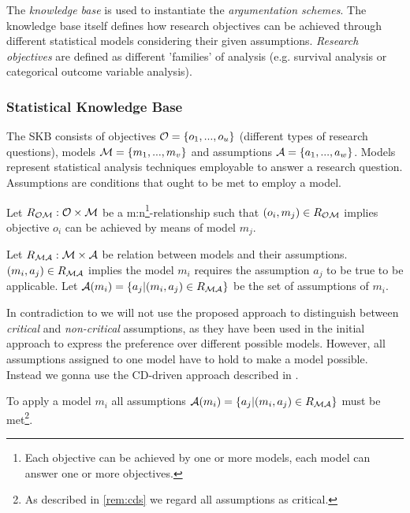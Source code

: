 The \textit{knowledge base} is used to instantiate the \textit{argumentation schemes}. The knowledge base itself defines how research objectives can be achieved through different statistical models considering their given assumptions. \textit{Research objectives} are defined as different 'families' of analysis (e.g. survival analysis or categorical outcome variable analysis).


\subsubsection*{Statistical Knowledge Base}


The \gls{SKB} consists of objectives $\mathcal{O}=\{o_1, ..., o_u\}$ (different types of research questions), models $\mathcal{M}=\{m_1, ..., m_v\}$ and assumptions $\mathcal{A} = \{a_1, ..., a_w\}$. Models represent statistical analysis techniques employable to answer a research question. Assumptions are conditions that ought to be met to employ a model.

\begin{definition}
	Let $R_{\mathcal{O}\mathcal{M}}: \mathcal{O} \times \mathcal{M}$ be a m:n\footnote{Each objective can be achieved by one or more models, each model can answer one or more objectives.}-relationship such that $(o_i, m_j)\in R_{\mathcal{O}\mathcal{M}}$ implies objective $o_i$ can be achieved by means of model $m_j$. 
\end{definition}

\begin{definition}
	Let $R_{\mathcal{M}\mathcal{A}}: \mathcal{M} \times \mathcal{A}$ be relation between models and their assumptions. $(m_i, a_j)\in R_{\mathcal{M}\mathcal{A}}$ implies  the model $m_i$ requires the assumption $a_j$ to be true to be applicable. Let $\mathcal{A}(m_i) = \{a_j | (m_i, a_j) \in R_{\mathcal{M}\mathcal{A}}\}$ be the set of assumptions of $m_i$.
\end{definition}

\begin{remark}
In contradiction to \cite{sassoon2014} we will not use the proposed approach to distinguish between \textit{critical} and \textit{non-critical} assumptions, as they have been used in the initial approach to express the preference over different possible models. However, all assumptions assigned to one model have to hold to make a model possible. Instead we gonna use the \gls{CD}-driven approach described in \cite{sassoon2016CD}.
\label{rem:cds}
\end{remark}


\begin{definition}
To apply a model $m_i$ all assumptions $\mathcal{A}(m_i) = \{a_j | (m_i, a_j) \in R_{\mathcal{M}\mathcal{A}} \}$ must be met\footnote{As described in \autoref{rem:cds} we regard all assumptions as critical.}.
\end{definition}

